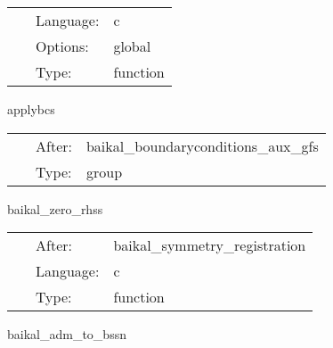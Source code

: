  \begin{tabular*}{160mm}{cll} 
~ & Language:  & c \\ 
~ & Options:  & global \\ 
~ & Type:  & function \\ 
\end{tabular*} 


\vspace{5mm}


\hspace{5mm} applybcs 

\hspace{5mm}{\it apply boundary conditions } 


\hspace{5mm}

 \begin{tabular*}{160mm}{cll} 
~ & After:  & baikal\_boundaryconditions\_aux\_gfs \\ 
~ & Type:  & group \\ 
\end{tabular*} 


\vspace{5mm}


\hspace{5mm} baikal\_zero\_rhss 

\hspace{5mm}{\it idea from lean: set all rhs functions to zero to prevent spurious nans } 


\hspace{5mm}

 \begin{tabular*}{160mm}{cll} 
~ & After:  & baikal\_symmetry\_registration \\ 
~ & Language:  & c \\ 
~ & Type:  & function \\ 
\end{tabular*} 


\vspace{5mm}


\hspace{5mm} baikal\_adm\_to\_bssn 

\hspace{5mm}{\it convert initial data into bssn variables } 


\hspace{5mm}

